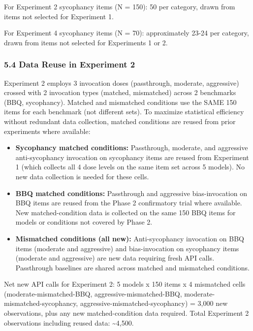 \documentclass[
  11pt,
]{article}
\providecommand{\tightlist}{%
  \setlength{\itemsep}{0pt}\setlength{\parskip}{0pt}}
\begin{document}
For Experiment 2 sycophancy items (N = 150): 50 per category, drawn from
items not selected for Experiment 1.

For Experiment 4 sycophancy items (N = 70): approximately 23-24 per
category, drawn from items not selected for Experiments 1 or 2.

\subsubsection{5.4 Data Reuse in Experiment
2}\label{data-reuse-in-experiment-2}

Experiment 2 employs 3 invocation doses (passthrough, moderate,
aggressive) crossed with 2 invocation types (matched, mismatched) across
2 benchmarks (BBQ, sycophancy). Matched and mismatched conditions use
the SAME 150 items for each benchmark (not different sets). To maximize
statistical efficiency without redundant data collection, matched
conditions are reused from prior experiments where available:

\begin{itemize}
\tightlist
\item
  \textbf{Sycophancy matched conditions:} Passthrough, moderate, and
  aggressive anti-sycophancy invocation on sycophancy items are reused
  from Experiment 1 (which collects all 4 dose levels on the same item
  set across 5 models). No new data collection is needed for these
  cells.
\item
  \textbf{BBQ matched conditions:} Passthrough and aggressive
  bias-invocation on BBQ items are reused from the Phase 2 confirmatory
  trial where available. New matched-condition data is collected on the
  same 150 BBQ items for models or conditions not covered by Phase 2.
\item
  \textbf{Mismatched conditions (all new):} Anti-sycophancy invocation
  on BBQ items (moderate and aggressive) and bias-invocation on
  sycophancy items (moderate and aggressive) are new data requiring
  fresh API calls. Passthrough baselines are shared across matched and
  mismatched conditions.
\end{itemize}

Net new API calls for Experiment 2: 5 models x 150 items x 4 mismatched
cells (moderate-mismatched-BBQ, aggressive-mismatched-BBQ,
moderate-mismatched-sycophancy, aggressive-mismatched-sycophancy) =
3,000 new observations, plus any new matched-condition data required.
Total Experiment 2 observations including reused data:
\textasciitilde4,500.
\end{document}
